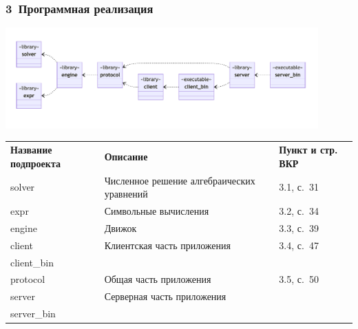 \documentclass[xetex,aspectratio=43]{beamer}
\begin{document}
\begin{frame}
    \frametitle{3~Программная реализация}

    \includegraphics[width=12cm]{libsdiagram}

    \vspace{-0.6cm}
    \begin{small}
        \begin{tabular}{|p{2cm}|p{6cm}|p{1.5cm}|}
            \hline \textbf{Название подпроекта} & \textbf{Описание}                          & \textbf{Пункт и стр. ВКР} \\ \hhline{|=|=|=|}

            solver                              & Численное решение алгебраических уравнений & 3.1, с.~31                \\ \hline
            expr                                & Символьные вычисления                      & 3.2, с.~34                \\ \hline
            engine                              & Движок                                     & 3.3, с.~39                \\ \hline
            client                              & Клиентская часть приложения                & 3.4, с.~47                \\
            client\_bin                         &                                            &                           \\ \hline
            protocol                            & Общая часть приложения                     & 3.5, с.~50                \\ \cline{1-2}
            server                              & Серверная часть приложения                 &                           \\
            server\_bin                         &                                            &                           \\ \hline
        \end{tabular}
    \end{small}
\end{frame}
\end{document}
